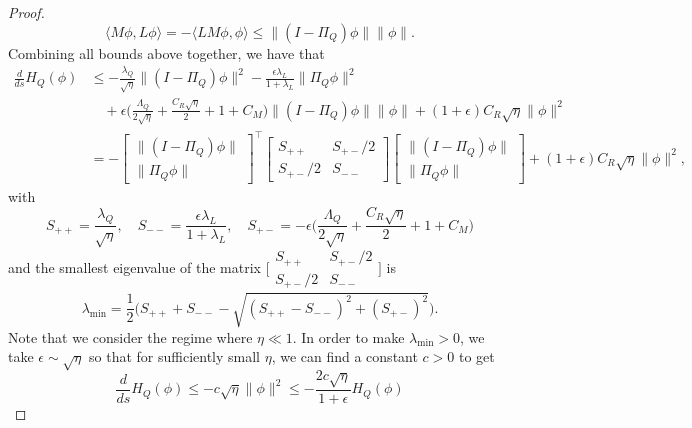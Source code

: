 \documentclass[10pt,a4paper]{amsart}
\begin{document}
\begin{proof}
\begin{equation}
    \langle M\phi, L \phi\rangle = -\langle LM\phi,  \phi\rangle\leq  \|(I-\Pi_Q)\phi\|\|\phi\|.
\end{equation}
Combining all bounds above together, we have that
\begin{equation}
\begin{aligned}
    \frac{d}{ds} H_Q(\phi) &\leq -\frac{\lambda_Q}{\sqrt{\eta}}\|(I-\Pi_Q)\phi\|^2-\frac{\epsilon\lambda_L}{1+\lambda_L} \|\Pi_Q\phi\|^2\\
    &\quad + \epsilon\Big(\frac{\Lambda_Q}{2\sqrt{\eta}}+\frac{C_R\sqrt{\eta}}{2}+1+C_M\Big)\|(I-\Pi_Q)\phi\|\|\phi\| + (1+\epsilon) C_R \sqrt{\eta} \|\phi\|^2\\
    & = -\begin{bmatrix}
            \|(I-\Pi_Q)\phi\| \\
            \|\Pi_Q\phi\|
        \end{bmatrix}^\top \begin{bmatrix}
            S_{++} & S_{+-}/2\\
          S_{+-}/2 & S_{--}
        \end{bmatrix} \begin{bmatrix}
            \|(I-\Pi_Q)\phi\| \\
            \|\Pi_Q\phi\| 
        \end{bmatrix}+(1+\epsilon)C_R \sqrt{\eta}\|\phi\|^2,
\end{aligned}
\end{equation}
with 
\begin{equation}
    S_{++} = \frac{\lambda_Q}{\sqrt{\eta}}, \quad S_{--} = \frac{\epsilon\lambda_L}{1+\lambda_L} , \quad S_{+-} = - \epsilon\Big(\frac{\Lambda_Q}{2\sqrt{\eta}}+\frac{C_R\sqrt{\eta}}{2}+1+C_M\Big)
\end{equation}
and the smallest eigenvalue of the matrix $\bigl[\begin{smallmatrix}
            S_{++} & S_{+-}/2\\
          S_{+-}/2 & S_{--}
        \end{smallmatrix} \bigr]$ is
\begin{equation}
    \lambda_{\min} = \frac{1}{2}\Big(S_{++} + S_{--}-\sqrt{(S_{++}-S_{--})^2+(S_{+-})^2}\Big).
\end{equation}
Note that we consider the regime where $\eta\ll1$. In order to make $\lambda_{\min}>0$,  we take $\epsilon \sim \sqrt{\eta}$ so that for sufficiently small $\eta$, we can find a constant $c>0$ to get
\begin{equation}
     \frac{d}{ds} H_Q(\phi) \leq -c\sqrt{\eta} \|\phi\|^2\leq -\frac{2c\sqrt{\eta}}{1+\epsilon} H_Q(\phi)

\end{equation}
\end{proof}
\end{document}

